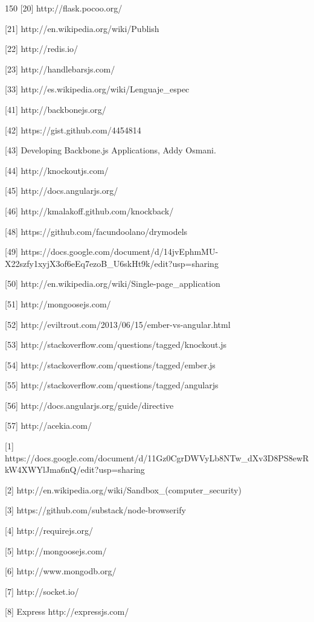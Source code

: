 \documentclass[doc,helv,longtable]{article}
\begin{document}
\begin{thebibliography}{150}
[20] http://flask.pocoo.org/

[21] http://en.wikipedia.org/wiki/Publish%

[22] http://redis.io/

[23] http://handlebarsjs.com/


[33] http://es.wikipedia.org/wiki/Lenguaje_espec%


[41] http://backbonejs.org/

[42] https://gist.github.com/4454814

[43] Developing Backbone.js Applications, Addy Osmani.

[44] http://knockoutjs.com/

[45] http://docs.angularjs.org/

[46] http://kmalakoff.github.com/knockback/



[48] https://github.com/facundoolano/drymodels

[49] https://docs.google.com/document/d/14jvEphmMU-X22szfy1xyjX3of6eEq7ezoB_U6skHt9k/edit?usp=sharing

[50] http://en.wikipedia.org/wiki/Single-page_application

[51] http://mongoosejs.com/

[52] http://eviltrout.com/2013/06/15/ember-vs-angular.html

[53] http://stackoverflow.com/questions/tagged/knockout.js

[54] http://stackoverflow.com/questions/tagged/ember.js

[55] http://stackoverflow.com/questions/tagged/angularjs

[56] http://docs.angularjs.org/guide/directive

[57] http://acekia.com/





[1] https://docs.google.com/document/d/11Gz0CgrDWVyLb8NTw_dXv3D8PS8ewRkW4XWYlJma6nQ/edit?usp=sharing

[2] http://en.wikipedia.org/wiki/Sandbox_(computer_security)

[3] https://github.com/substack/node-browserify

[4] http://requirejs.org/

[5] http://mongoosejs.com/

[6] http://www.mongodb.org/

[7] http://socket.io/

[8] Express http://expressjs.com/


\end{thebibliography}
\end{document}
